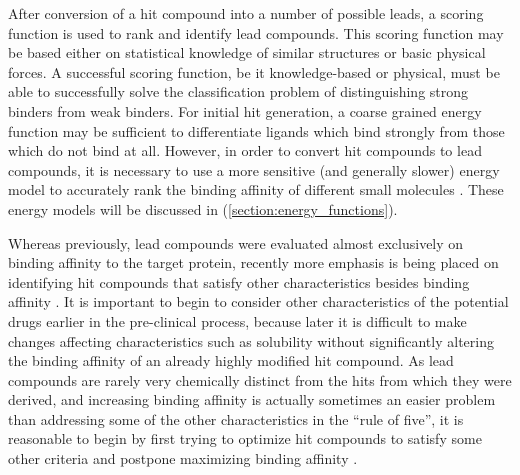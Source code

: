 After conversion of a hit compound into a number of possible leads, a scoring function is used to rank and identify lead compounds.
This scoring function may be based either on statistical knowledge of similar structures or basic physical forces.
A successful scoring function, be it knowledge-based or physical, must be able to successfully solve the classification problem of distinguishing strong binders from weak binders.
For initial hit generation, a coarse grained energy function may be sufficient to differentiate ligands which bind strongly from those which do not bind at all.
However, in order to convert hit compounds to lead compounds, it is necessary to use a more sensitive (and generally slower) energy model to accurately rank the binding affinity of different small molecules \cite{jorgensen2004many,gohlke2002approaches}.
These energy models will be discussed in  (\ref{section:energy_functions}).

Whereas previously, lead compounds were evaluated almost exclusively on binding affinity to the target protein, recently more emphasis is being placed on identifying hit compounds that satisfy other characteristics besides binding affinity \cite{bleicher2003hit}.
It is important to begin to consider other characteristics of the potential drugs earlier in the pre-clinical process, because later it is difficult to make changes affecting characteristics such as solubility without significantly altering the binding affinity of an already highly modified hit compound.
As lead compounds are rarely very chemically distinct from the hits from which they were derived, and increasing binding affinity is actually sometimes an easier problem than addressing some of the other characteristics in the ``rule of five'', it is reasonable to begin by first trying to optimize hit compounds to satisfy some other criteria and postpone maximizing binding affinity \cite{proudfoot2002drugs}.
